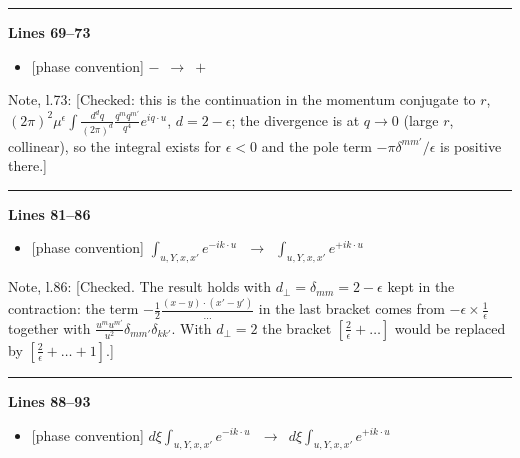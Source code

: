 \documentclass[10pt]{article}
\newenvironment{notebox}{\def\FrameCommand{{\color{notebar}\vrule width 1.5pt}\hspace{6pt}}\MakeFramed{\advance\hsize-\width\FrameRestore}\small}{\endMakeFramed}
\begin{document}
\noindent\rule{\linewidth}{0.3pt}\par\noindent\textbf{Lines 69--73} \par
\begin{itemize}[leftmargin=2.2em,itemsep=1pt,topsep=2pt]
\item[\textbf{l.69}] \textsf{\small [phase convention]} $\displaystyle -$\ $\longrightarrow$\ $\displaystyle +$
\end{itemize}
\begin{notebox}\textsf{\small Note, l.73:} [Checked: this is the continuation in the momentum conjugate to $r$, $(2\pi)^{2}\mu^{\epsilon}\int\frac{d^{d}q}{(2\pi)^{d}}\frac{q^{m}q^{m'}}{q^{4}}e^{iq\cdot u}$, $d=2-\epsilon$; the divergence is at $q\to0$ (large $r$, collinear), so the integral exists for $\epsilon<0$ and the pole term $-\pi\delta^{mm'}/\epsilon$ is positive there.]\end{notebox}
\noindent\rule{\linewidth}{0.3pt}\par\noindent\textbf{Lines 81--86} \par
\begin{itemize}[leftmargin=2.2em,itemsep=1pt,topsep=2pt]
\item[\textbf{l.81}] \textsf{\small [phase convention]} $\displaystyle \int_{u,Y,x,x'}e^{-ik\cdot u}\,$\ $\longrightarrow$\ $\displaystyle \int_{u,Y,x,x'}e^{+ik\cdot u}\,$
\end{itemize}
\begin{notebox}\textsf{\small Note, l.86:} [Checked. The result holds with $d_{\perp}=\delta_{mm}=2-\epsilon$ kept in the contraction: the term $-\frac12\frac{(x-y)\cdot(x'-y')}{\dots}$ in the last bracket comes from $-\epsilon\times\frac{1}{\epsilon}$ together with $\frac{u^{m}u^{m'}}{u^{2}}\delta_{mm'}\delta_{kk'}$. With $d_{\perp}=2$ the bracket $[\frac{2}{\epsilon}+\dots]$ would be replaced by $[\frac{2}{\epsilon}+\dots+1]$.]\end{notebox}
\noindent\rule{\linewidth}{0.3pt}\par\noindent\textbf{Lines 88--93} \par
\begin{itemize}[leftmargin=2.2em,itemsep=1pt,topsep=2pt]
\item[\textbf{l.88}] \textsf{\small [phase convention]} $\displaystyle d\xi\int_{u,Y,x,x'}e^{-ik\cdot u}\,$\ $\longrightarrow$\ $\displaystyle d\xi\int_{u,Y,x,x'}e^{+ik\cdot u}\,$
\end{itemize}
\end{document}
